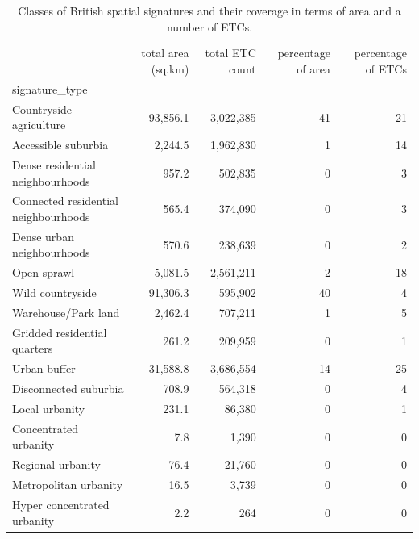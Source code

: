 \begin{table}
    \caption{\label{tab:sig_types}Classes of British spatial signatures and their
    coverage in terms of area and a number of ETCs.}
\begin{tabular}{lrrrr}
    \toprule
    {} &        total area (sq.km) &  total ETC count &  percentage of area &
    percentage of ETCs \\
    signature\_type                       &             &         &            &
    \\
    \midrule
    Countryside agriculture              & 93,856.1 & 3,022,385 &         41 &
    21 \\
    Accessible suburbia                  &  2,244.5 & 1,962,830 &          1 &
    14 \\
    Dense residential neighbourhoods     &    957.2 &   502,835 &          0 &
    3 \\
    Connected residential neighbourhoods &    565.4 &   374,090 &          0 &
    3 \\
    Dense urban neighbourhoods           &    570.6 &   238,639 &          0 &
    2 \\
    Open sprawl                          &  5,081.5 & 2,561,211 &          2 &
    18 \\
    Wild countryside                     & 91,306.3 &   595,902 &         40 &
    4 \\
    Warehouse/Park land                  &  2,462.4 &   707,211 &          1 &
    5 \\
    Gridded residential quarters         &    261.2 &   209,959 &          0 &
    1 \\
    Urban buffer                         & 31,588.8 & 3,686,554 &         14 &
    25 \\
    Disconnected suburbia                &    708.9 &   564,318 &          0 &
    4 \\
    Local urbanity                       &    231.1 &    86,380 &          0 &
    1 \\
    Concentrated urbanity                &      7.8 &     1,390 &          0 &
    0 \\
    Regional urbanity                    &     76.4 &    21,760 &          0 &
    0 \\
    Metropolitan urbanity                &     16.5 &     3,739 &          0 &
    0 \\
    Hyper concentrated urbanity          &      2.2 &       264 &          0 &
    0 \\
    \bottomrule
\end{tabular}
\end{table}



